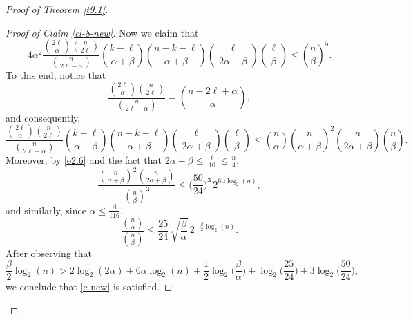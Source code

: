 \documentclass[10pt,a4paper]{amsart}
\theoremstyle{remark}
\newcommand{\mik}{\leqslant}
\begin{document}
\begin{proof}[Proof of Theorem \emph{\ref{t9.1}}]
\begin{proof}[Proof of Claim \emph{\ref{cl-8-new}}]
Now we claim that
\begin{equation} \label{e-new}
4\alpha^2\frac{\binom{2\ell}{\alpha}\binom{n}{2\ell}}{\binom{n}{2\ell-\alpha}}
\binom{k-\ell}{\alpha+\beta}\binom{n-k-\ell}{\alpha+\beta}
\binom{\ell}{2\alpha+\beta}\binom{\ell}{\beta} \mik \binom{n}{\beta}^5.
\end{equation}
To this end, notice that
\begin{equation} \label{en9.4}
\frac{\binom{2\ell}{\alpha}\binom{n}{2\ell}}{\binom{n}{2\ell-\alpha}}=\binom{n-2\ell+\alpha}{\alpha},
\end{equation}
and consequently,
\begin{equation} \label{en9.5}
\frac{\binom{2\ell}{\alpha}\binom{n}{2\ell}}{\binom{n}{2\ell-\alpha}}
\binom{k-\ell}{\alpha+\beta}\binom{n-k-\ell}{\alpha+\beta}
\binom{\ell}{2\alpha+\beta}\binom{\ell}{\beta} \mik
\binom{n}{\alpha} \binom{n}{\alpha+\beta}^2 \binom{n}{2\alpha+\beta}\binom{n}{\beta}.
\end{equation}
Moreover, by \eqref{e2.6} and the fact that $2\alpha+\beta \mik \frac{\ell}{10}\mik \frac{n}{4}$,
\begin{equation} \label{en9.6}
\frac{\binom{n}{\alpha+\beta}^2 \binom{n}{2\alpha+\beta}}{\binom{n}{\beta}^3} \mik
\Big(\frac{50}{24}\Big)^3 \, 2^{6\alpha\log_2(n)},
\end{equation}
and similarly, since $\alpha\mik \frac{\beta}{116}$,
\begin{equation} \label{en9.7}
\frac{\binom{n}{\alpha}}{\binom{n}{\beta}} \mik
\frac{25}{24}\, \sqrt{\frac{\beta}{\alpha}}\, 2^{-\frac{\beta}{2}\log_2(n)}.
\end{equation}
After observing that
\begin{equation} \label{en9.8}
\frac{\beta}{2} \log_2(n)> 2\log_2(2\alpha)+6\alpha \log_2(n)+ \frac{1}{2}\log_2\Big(\frac{\beta}{\alpha}\Big) +
\log_2\Big(\frac{25}{24}\Big) + 3\log_2\Big(\frac{50}{24}\Big),
\end{equation}
we conclude that \eqref{e-new} is satisfied.


\end{proof}
\end{proof}
\end{document}
